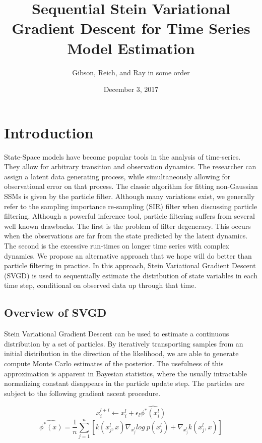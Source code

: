\documentclass[]{article}
\title{Sequential Stein Variational Gradient Descent for Time Series Model
Estimation}
\author{Gibson, Reich, and Ray in some order}
\date{December 3, 2017}
\begin{document}
\maketitle

\section{Introduction}\label{introduction}

State-Space models have become popular tools in the analysis of
time-series. They allow for arbitrary transition and observation
dynamics. The researcher can assign a latent data generating process,
while simultaneously allowing for observational error on that process.
The classic algorithm for fitting non-Gaussian SSMs is given by the
particle filter. Although many variations exist, we generally refer to
the sampling importance re-sampling (SIR) filter when discussing
particle filtering. Although a powerful inference tool, particle
filtering suffers from several well known drawbacks. The first is the
problem of filter degeneracy. This occurs when the observations are far
from the state predicted by the latent dynamics. The second is the
excessive run-times on longer time series with complex dynamics. We
propose an alternative approach that we hope will do better than
particle filtering in practice. In this approach, Stein Variational
Gradient Descent (SVGD) is used to sequentially estimate the
distribution of state variables in each time step, conditional on
observed data up through that time.

\subsection{Overview of SVGD}\label{overview-of-svgd}

Stein Variational Gradient Descent can be used to estimate a continuous
distribution by a set of particles. By iteratively transporting samples
from an initial distribution in the direction of the likelihood, we are
able to generate compute Monte Carlo estimates of the posterior. The
usefulness of this approximation is apparent in Bayesian statistics,
where the usually intractable normalizing constant disappears in the
particle update step. The particles are subject to the following
gradient ascent procedure.

\[x_i^{l+i} \leftarrow x_i^{l}+\epsilon_l\hat{\phi^*(x_i^l)}   \]
\[\hat{\phi^*(x)} = \frac{1}{n}\sum_{j=1}^n[k(x_j^l,x)\nabla_{x_j^l}log\ p(x_j^l) + \nabla_{x_j^l}k(x_j^l,x)]\]
\end{document}
